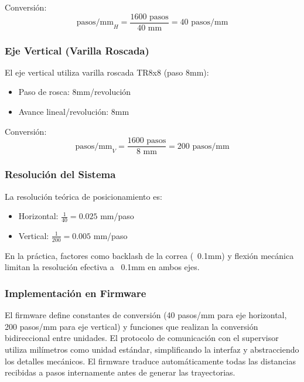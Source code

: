 Conversión:
\begin{equation}
\text{pasos/mm}_H = \frac{1600 \text{ pasos}}{40 \text{ mm}} = 40 \text{ pasos/mm}
\end{equation}

\subsubsection{Eje Vertical (Varilla Roscada)}

El eje vertical utiliza varilla roscada TR8x8 (paso 8mm):

\begin{itemize}
    \item Paso de rosca: 8mm/revolución
    \item Avance lineal/revolución: 8mm
\end{itemize}

Conversión:
\begin{equation}
\text{pasos/mm}_V = \frac{1600 \text{ pasos}}{8 \text{ mm}} = 200 \text{ pasos/mm}
\end{equation}

\subsubsection{Resolución del Sistema}

La resolución teórica de posicionamiento es:

\begin{itemize}
    \item Horizontal: $\frac{1}{40} = 0.025$ mm/paso
    \item Vertical: $\frac{1}{200} = 0.005$ mm/paso
\end{itemize}

En la práctica, factores como backlash de la correa (~0.1mm) y flexión mecánica limitan la resolución efectiva a ~0.1mm en ambos ejes.

\subsubsection{Implementación en Firmware}

El firmware define constantes de conversión (40 pasos/mm para eje horizontal, 200 pasos/mm para eje vertical) y funciones que realizan la conversión bidireccional entre unidades. El protocolo de comunicación con el supervisor utiliza milímetros como unidad estándar, simplificando la interfaz y abstracciendo los detalles mecánicos. El firmware traduce automáticamente todas las distancias recibidas a pasos internamente antes de generar las trayectorias.
